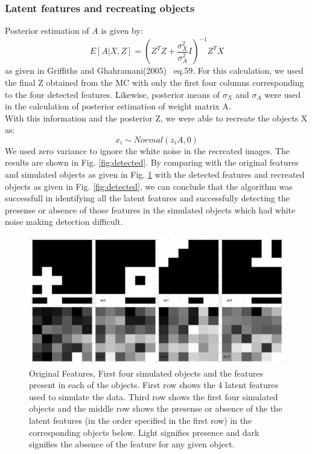 \documentclass{article}
\begin{document}
\subsubsection{Latent features and recreating objects}
Posterior estimation of $A$ is given by:
\[
E[A|X,Z] = (Z^TZ+\frac{\sigma_X^2}{\sigma_A^2}I)^{-1}Z^TX
\]
as given in Griffiths and Ghahramani(2005)~\cite{griffiths1} eq.59. For this calculation, we used the final Z obtained from the MC with only the first four columns corresponding to the four detected features. Likewise, posterior means of $\sigma_X$ and $\sigma_A$ were used in the calculation of posterior estimation of weight matrix A.\\

With this information and the posterior Z, we were able to recreate the objects X as:
\[
x_i \sim Normal(z_iA,0)
\]
We used zero variance to ignore the white noise in the recreated images. The results are shown in Fig. \ref{fig:detected}. By comparing with the original features and simulated objects as given in Fig. \ref{fig:original} with the detected features and recreated objects as given in Fig. \ref{fig:detected}, we can conclude that the algorithm was successfull in identifying all the latent features and successfully detecting the presense or absence of those features in the simulated objects which had white noise making detection difficult.


\begin{figure}
\includegraphics[width=\linewidth]{figures/Original.png}
\caption {Original Features, First four simulated objects and the features present in each of the objects. First row shows the 4 latent features used to simulate the data. Third row shows the first four simulated objects and the middle row shows the presense or absence of the the latent features (in the order specified in the first row) in the corresponding objects below. Light signifies presence and dark signifies the absence of the feature for any given object.}
\label{fig:original}
\end{figure}
\end{document}
